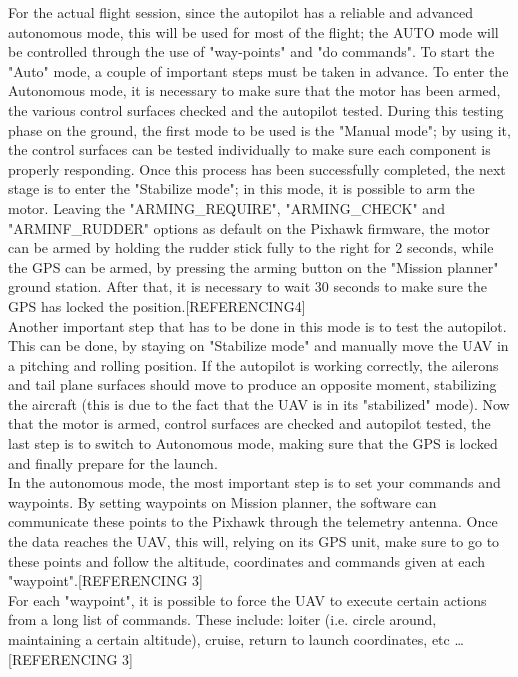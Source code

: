 \documentclass[12pt]{article}
\begin{document}
\noindent For the actual flight session, since the autopilot has a reliable and advanced autonomous mode, this will be used for most of the flight; the AUTO mode will be controlled through the use of "way-points" and "do commands". To start the "Auto" mode, a couple of important steps must be taken in advance. To enter the Autonomous mode, it is necessary to make sure that the motor has been armed, the various control surfaces checked and the autopilot tested. During this testing phase on the ground, the first mode to be used is the "Manual mode"; by using it, the control surfaces can be tested individually to make sure each component is properly responding. Once this process has been successfully completed, the next stage is to enter the "Stabilize mode"; in this mode, it is possible to arm the motor. Leaving the "ARMING\_REQUIRE", "ARMING\_CHECK" and "ARMINF\_RUDDER" options as default on the Pixhawk firmware, the motor can be armed by holding the rudder stick fully to the right for 2 seconds, while the GPS can be armed, by pressing the arming button on the "Mission planner" ground station. After that, it is necessary to wait 30 seconds to make sure the GPS has locked the position.[REFERENCING4] \\

\noindent Another important step that has to be done in this mode is to test the autopilot. This can be done, by staying on "Stabilize mode" and manually move the UAV in a pitching and rolling position. If the autopilot is working correctly, the ailerons and tail plane surfaces should move to produce an opposite moment, stabilizing the aircraft (this is due to the fact that the UAV is in its "stabilized" mode). Now that the motor is armed, control surfaces are checked and autopilot tested, the last step is to switch to Autonomous mode, making sure that the GPS is locked and finally prepare for the launch. \\

\noindent In the autonomous mode, the most important step is to set your commands and waypoints. By setting waypoints on Mission planner, the software can communicate these points to the Pixhawk through the telemetry antenna. Once the data reaches the UAV, this will, relying on its GPS unit, make sure to go to these points and follow the altitude, coordinates and commands given at each "waypoint".[REFERENCING 3] \\

\noindent For each "waypoint", it is possible to force the UAV to execute certain actions from a long list of commands. These include: loiter (i.e. circle around, maintaining a certain altitude), cruise, return to launch coordinates, etc \ldots [REFERENCING 3] \\
\end{document}
